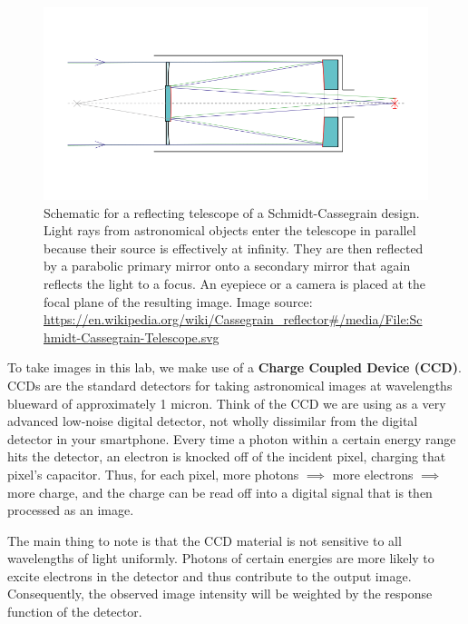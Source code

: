 \begin{figure}
	\centering
	\includegraphics[scale = 0.5]{small-optical-telescopes/Schmidt-Cassegrain-Telescope.png}
	\caption{Schematic for a reflecting telescope of a Schmidt-Cassegrain design. 
		Light rays from astronomical objects enter the telescope in parallel because their source is effectively at infinity. They are then reflected by a parabolic primary mirror onto a secondary mirror that again reflects the light to a focus. An eyepiece or a camera is placed at the focal plane of the resulting image. Image source: \url{https://en.wikipedia.org/wiki/Cassegrain\_reflector\#/media/File:Schmidt-Cassegrain-Telescope.svg}}\label{sot:fig:schmidt}
\end{figure}

To take images in this lab,
 we make use of a \textbf{Charge Coupled Device (CCD)}. CCDs are the standard detectors for taking astronomical images at wavelengths blueward of approximately 1 micron. Think of the CCD we are using as a
very advanced low-noise digital detector, not wholly dissimilar from the digital detector in your
smartphone. Every time a photon within a certain energy range hits the detector, an electron is knocked off of the incident pixel, charging that pixel's capacitor. Thus, for each pixel, more photons $\implies$ more electrons $\implies$ more charge, and the charge can be read off into a digital signal that is then processed as an image. 

The main thing to note is that the CCD material is not sensitive to all wavelengths of light uniformly. Photons of certain energies are more likely to excite electrons in the detector and thus contribute to the output image. Consequently, the observed image intensity will be weighted by the response function of the detector.

